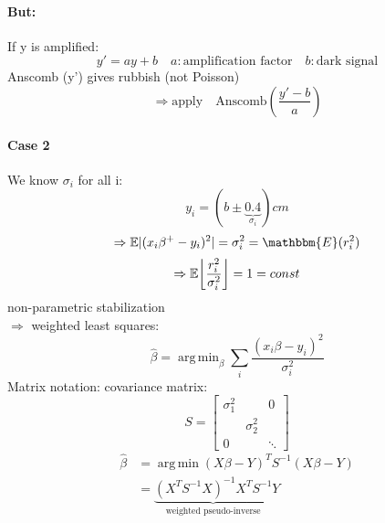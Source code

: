 \documentclass[11pt]{article}
\DeclareMathOperator*{\argmin}{arg\,min}
\DeclarePairedDelimiter\floor{\lfloor}{\rfloor}
\DeclarePairedDelimiter\abs{\lvert}{\rvert}
\begin{document}
      \paragraph{But:} If y is amplified:
      \begin{equation*}
        y' = ay + b \quad a: \text{amplification factor} \quad b: \text{dark signal}
      \end{equation*}
      Anscomb (y') gives rubbish (not Poisson) \\
      \begin{equation*}
        \Rightarrow \text{apply} \quad \text{Anscomb} \left(\frac{y'-b}{a}\right)
      \end{equation*}
      \paragraph{Case 2} We know $\sigma_i$ for all i:
      \begin{equation*}
        y_i = \left(b \pm \underbrace{0.4}_{\sigma_i}\right) cm
      \end{equation*}
      \begin{equation*}
        \Rightarrow \mathbb{E} \abs{(x_i\beta^+-y_i)^2} = \sigma_i^2 = \mathbbm{E}(r_i^2)
      \end{equation*}
      \begin{equation*}
        \Rightarrow \mathbb{E} \floor*{\frac{r_i^2}{\sigma_i^2}} = 1 = const
      \end{equation*}
      non-parametric stabilization \\
      $\Rightarrow$ weighted least squares:
      \begin{equation*}
        \boxed{\hat{\beta} = \argmin_{\beta} \sum_i \frac{(x_i\beta-y_i)^2}{\sigma_i^2}}
      \end{equation*}
      Matrix notation: covariance matrix:
      \begin{equation*} S =
        \left[
        \begin{array}{ccc}
          \sigma_1^2 & & 0 \\
          & \sigma_2^2 & \\
          0 & & \ddots
        \end{array}
        \right]
      \end{equation*}
      \begin{equation*}
        \begin{align*}
          \hat{\beta} &= \argmin (X\beta-Y)^T S^{-1} (X\beta-Y) \\
          &= \underbrace{(X^TS^{-1}X)^{-1}X^TS^{-1}}_{\text{weighted pseudo-inverse}}Y
        \end{align*}
      \end{equation*}
\end{document}

